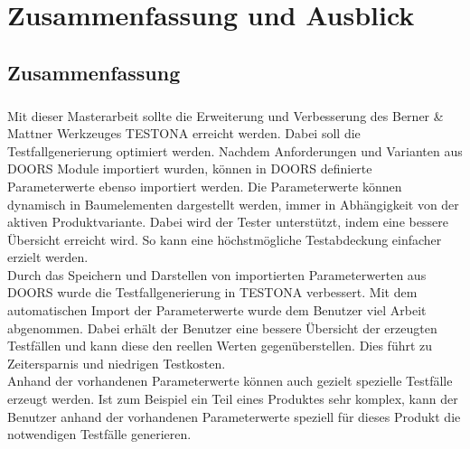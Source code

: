 \chapter{Zusammenfassung und Ausblick}\label{chp:zusammenfassung}



\newpage
\section{Zusammenfassung}
\paragraph{}
Mit dieser Masterarbeit sollte die Erweiterung und Verbesserung des Berner \& Mattner Werkzeuges TESTONA erreicht werden. Dabei soll die Testfallgenerierung optimiert werden. Nachdem Anforderungen und Varianten aus DOORS Module importiert wurden, können in DOORS definierte Parameterwerte ebenso importiert werden. Die Parameterwerte können dynamisch in Baumelementen dargestellt werden, immer in Abhängigkeit von der aktiven Produktvariante. Dabei wird der Tester unterstützt, indem eine bessere Übersicht erreicht wird. So kann eine höchstmögliche Testabdeckung einfacher erzielt werden.\\


Durch das Speichern und Darstellen von importierten Parameterwerten aus DOORS wurde die Testfallgenerierung in TESTONA verbessert. Mit dem automatischen Import der Parameterwerte wurde dem Benutzer viel Arbeit abgenommen. Dabei erhält der Benutzer eine bessere Übersicht der erzeugten Testfällen und kann diese den reellen Werten gegenüberstellen. Dies führt zu Zeitersparnis und niedrigen Testkosten.\\


Anhand der vorhandenen Parameterwerte können auch gezielt spezielle Testfälle erzeugt werden. Ist zum Beispiel ein Teil eines Produktes sehr komplex, kann der Benutzer anhand der vorhandenen Parameterwerte speziell für dieses Produkt die notwendigen Testfälle generieren.\\


